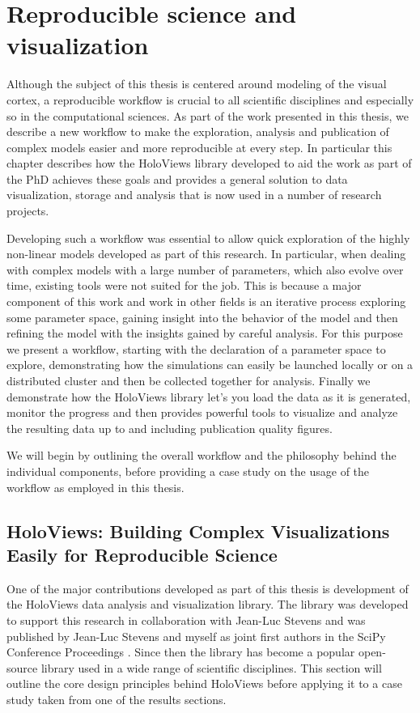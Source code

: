 \chapter{Reproducible science and visualization}

Although the subject of this thesis is centered around modeling of the
visual cortex, a reproducible workflow is crucial to all scientific
disciplines and especially so in the computational sciences. As part
of the work presented in this thesis, we describe a new workflow to
make the exploration, analysis and publication of complex models
easier and more reproducible at every step. In particular this chapter
describes how the HoloViews library developed to aid the work as part
of the PhD achieves these goals and provides a general solution to
data visualization, storage and analysis that is now used in a number
of research projects.

Developing such a workflow was essential to allow quick exploration of
the highly non-linear models developed as part of this research. In
particular, when dealing with complex models with a large number of
parameters, which also evolve over time, existing tools were not
suited for the job. This is because a major component of this work and
work in other fields is an iterative process exploring some parameter
space, gaining insight into the behavior of the model and then
refining the model with the insights gained by careful analysis. For
this purpose we present a workflow, starting with the declaration of a
parameter space to explore, demonstrating how the simulations can
easily be launched locally or on a distributed cluster and then be
collected together for analysis. Finally we demonstrate how the
HoloViews library let's you load the data as it is generated, monitor
the progress and then provides powerful tools to visualize and analyze
the resulting data up to and including publication quality figures.

We will begin by outlining the overall workflow and the philosophy
behind the individual components, before providing a case study on
the usage of the workflow as employed in this thesis.

\section{HoloViews: Building Complex Visualizations Easily for Reproducible Science}

One of the major contributions developed as part of this thesis is
development of the HoloViews data analysis and visualization library.
The library was developed to support this research in collaboration
with Jean-Luc Stevens and was published by Jean-Luc Stevens and myself
as joint first authors in the SciPy Conference Proceedings
\citep{Stevens2015}. Since then the library has become a popular
open-source library used in a wide range of scientific
disciplines. This section will outline the core design principles
behind HoloViews before applying it to a case study taken from one of
the results sections.

